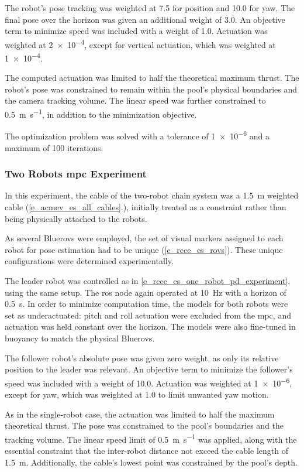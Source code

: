 The robot's pose tracking was weighted at \num{7.5} for position and \num{10.0} for yaw. The final
pose over the horizon was given an additional weight of \num{3.0}. An objective term to minimize
speed was included with a weight of \num{1.0}. Actuation was weighted at \num{2e-4}, except for
vertical actuation, which was weighted at \num{1e-4}.

The computed actuation was limited to half the theoretical maximum thrust. The robot's pose was
constrained to remain within the pool's physical boundaries and the camera tracking volume. The
linear speed was further constrained to \qty{0.5}{\m\per\s}, in addition to the minimization
objective.

The optimization problem was solved with a tolerance of \num{1e-6} and a maximum of \num{100}
iterations.

\subsubsection{Two Robots \acs{mpc} Experiment} \label{e_rcce_es_two_robots_mpc_experiment}

In this experiment, the cable of the two-robot chain system was a \qty{1.5}{\meter} weighted cable
(\cref{e_acmev_es_all_cables}.), initially treated as a constraint
rather than being physically attached to the robots.

As several Bluerovs were employed, the set of visual markers assigned to each robot for pose
estimation had to be unique (\cref{e_rcce_es_rovs}). These unique configurations were determined
experimentally.

The leader robot was controlled as in \cref{e_rcce_es_one_robot_pd_experiment}, using the same
setup. The \ac{ros} node again operated at \qty{10}{\Hz} with a horizon of \qty{0.5}{\s}. In order
to minimize computation time, the models for both robots were set as underactuated: pitch and roll
actuation were excluded from the \ac{mpc}, and actuation was held constant over the horizon. The
models were also fine-tuned in buoyancy to match the physical Bluerovs.

The follower robot's absolute pose was given zero weight, as only its relative position to the
leader was relevant. An objective term to minimize the follower's speed was included with a weight
of \num{10.0}. Actuation was weighted at \num{1e-6}, except for yaw, which was weighted at
\num{1.0} to limit unwanted yaw motion.

As in the single-robot case, the actuation was limited to half the maximum theoretical thrust. The
pose was constrained to the pool's boundaries and the tracking volume. The linear speed limit of
\qty{0.5}{\m\per\s} was applied, along with the essential constraint that the inter-robot distance
not exceed the cable length of \qty{1.5}{\meter}. Additionally, the cable's lowest point was
constrained by the pool's depth.

